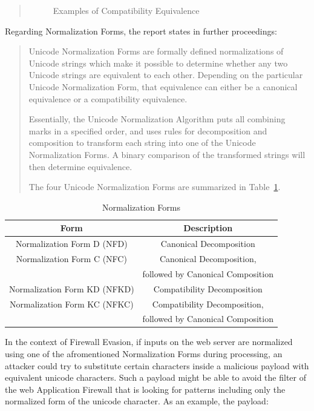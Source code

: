 \begin{quote}
\begin{figure}[!h]
		\caption{Examples of Compatibility Equivalence \cite{unicode/normalization}}
		\label{fig:compeq}
	\end{figure}
\end{quote}

Regarding Normalization Forms, the report states in further proceedings:
\begin{quote}
	Unicode Normalization Forms are formally defined normalizations of Unicode strings which make it possible to determine whether any two Unicode strings are equivalent to each other. Depending on the particular Unicode Normalization Form, that equivalence can either be a canonical equivalence or a compatibility equivalence.

	Essentially, the Unicode Normalization Algorithm puts all combining marks in a specified order, and uses rules for decomposition and composition to transform each string into one of the Unicode Normalization Forms. A binary comparison of the transformed strings will then determine equivalence.

	The four Unicode Normalization Forms are summarized in Table~\ref{tab:normform}. \cite{unicode/normalization}
\end{quote}
\begin{table}
	\centering
	\begin{tabular}{ |c|c| }
		\hline
		Form                         & Description                       \\
		\hline
		\hline
		Normalization Form D (NFD)   & Canonical Decomposition           \\
		\hline
		Normalization Form C (NFC)   & Canonical Decomposition,          \\
		                             & followed by Canonical Composition \\
		\hline
		Normalization Form KD (NFKD) & Compatibility Decomposition       \\
		Normalization Form KC (NFKC) & Compatibility Decomposition,      \\
		                             & followed by Canonical Composition \\
		\hline
	\end{tabular}
	\caption{Normalization Forms}
	\label{tab:normform}
\end{table}
In the context of Firewall Evasion, if inputs on the web server are normalized using one of the afromentioned Normalization Forms during processing, an attacker could try to substitute certain characters inside a malicious payload with equivalent unicode characters. \cite{medium/allypetitt}
Such a payload might be able to avoid the filter of the web Application Firewall that is looking for patterns including only the normalized form of the unicode character. As an example, the payload:

